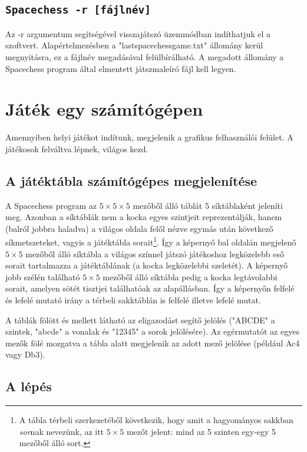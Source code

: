 \documentclass[12pt, twoside]{report}
\begin{document}
\subsection*{\tt Spacechess -r [fájlnév]}
Az -r argumentum segítségével visszajátszó üzemmódban indíthatjuk el a szoftvert. Alapértelmezésben a "lastspacechessgame.txt" állomány kerül megnyitásra, ez a fájlnév megadásával felülbírálható. A megadott állomány a Spacechess program által elmentett játszmaleíró fájl kell legyen.


\section{Játék egy számítógépen}

Amennyiben helyi játékot indítunk, megjelenik a grafikus felhasználói felület. A já\-té\-ko\-sok felváltva lépnek, világos kezd. 

\subsection{A játéktábla számítógépes megjelenítése}

A Spacechess program az $ 5 \times 5 \times 5 $ mezőből álló táblát 5 síktáblaként jeleníti meg. Azonban a síktáblák nem a kocka egyes szintjeit reprezentálják, hanem (balról jobbra haladva) a világos oldala felől nézve egymás után következő síkmetszeteket, vagyis a játéktábla sorait\footnote{A tábla térbeli szerkezetéből következik, hogy amit a hagyományos sakkban \textit{sor}nak nevezünk, az itt $ 5 \times 5 $ mezőt jelent: mind az 5 szinten egy-egy 5 mezőből álló sort.}. Így a képernyő bal oldalán megjelenő $ 5 \times 5 $ mezőből álló síktábla a világos színnel játszó játékoshoz legközelebb eső sorait tartalmazza a játéktáblának (a kocka legközelebbi szeletét). A képernyő jobb szélén található $ 5 \times 5 $ mezőből álló síktábla pedig a kocka legtávolabbi sorait, amelyen sötét tisztjei találhatóak az alapállásban. Így a képernyőn felfelé és lefelé mutató irány a térbeli sakktáblán is felfelé illetve lefelé mutat. 

A táblák fölött és mellett látható az eligazodást segítő jelölés ("ABCDE" a szintek, "abcde" a vonalak és "12345" a sorok jelölésére). Az egérmutatót az egyes mezők fölé mozgatva a tábla alatt megjelenik az adott mező jelölése (például Ac4 vagy Db3).

\subsection{A lépés}
\end{document}
